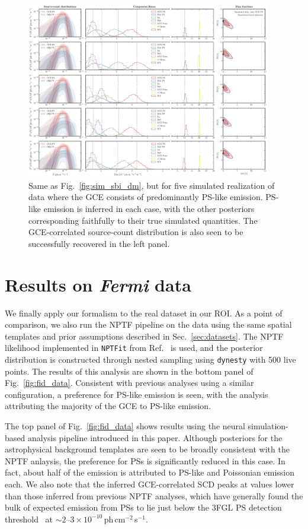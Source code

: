 \documentclass[prd,aps,10pt,nofootinbib,twocolumn,superscriptaddress,preprintnumbers,balancelastpage,longbibliography]{revtex4-1}
\begin{document}
%
\begin{figure}
    \centering
    \includegraphics[width=0.95\textwidth]{plots/sim_sbi_ps.pdf}
    \caption{Same as Fig.~\ref{fig:sim_sbi_dm}, but for five simulated realization of \Fermi data where the GCE consists of predominantly PS-like emission. PS-like emission is inferred in each case, with the other posteriors corresponding faithfully to their true simulated quantities. The GCE-correlated source-count distribution is also seen to be successfully recovered in the left panel.}
    \label{fig:sim_sbi_ps}
\end{figure}
%

\section{Results on \emph{Fermi} data}
\label{sec:data}

We finally apply our formalism to the real \Fermi dataset in our ROI. As a point of comparison, we also run the NPTF pipeline on the data using the same spatial templates and prior assumptions described in Sec.~\ref{sec:datasets}. The NPTF likelihood implemented in \texttt{NPTFit} from Ref.~\cite{Mishra-Sharma:2016gis} is used, and the posterior distribution is constructed through nested sampling using \texttt{dynesty} with 500 live points. The results of this analysis are shown in the bottom panel of Fig.~\ref{fig:fid_data}. Consistent with previous analyses using a similar configuration, a preference for PS-like emission is seen, with the analysis attributing the majority of the GCE to PS-like emission. 

The top panel of Fig.~\ref{fig:fid_data} shows results using the neural simulation-based analysis pipeline introduced in this paper. Although posteriors for the astrophysical background templates are seen to be broadly consistent with the NPTF anlaysis, the preference for PSs is significantly reduced in this case. In fact, about half of the emission is attributed to PS-like and Poissonian emission each. We also note that the inferred GCE-correlated SCD peaks at values lower than those inferred from previous NPTF analyses, which have generally found the bulk of expected emission from PSs to lie just below the 3FGL PS detection threshold~\cite{Lee:2015fea} at $\sim2$--$3\times 10^{-10}$\,ph\,cm$^{-2}$\,s$^{-1}$. 
\end{document}
